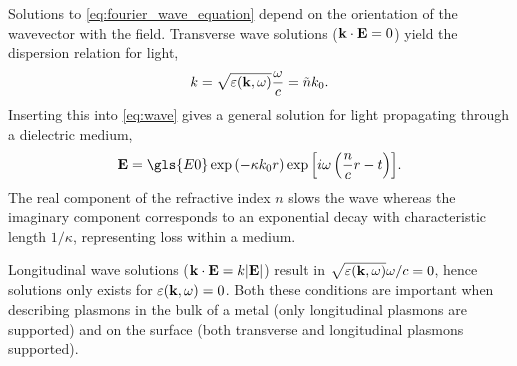\documentclass{article}
\begin{document}
Solutions to \eqref{eq:fourier_wave_equation} depend on the orientation of the wavevector with the field. Transverse wave solutions ($\mathbf{k}\cdot\mathbf{E}=0$) yield the dispersion relation for light,
\begin{equation}
	k = \sqrt{\varepsilon(\mathbf{k}, \omega)}\frac{\omega}{c}=\tilde{n}k_0.
	\label{eq:light_dispersion}
\end{equation}
Inserting this into \eqref{eq:wave} gives a general solution for light propagating through a dielectric medium,
\begin{equation}
	\vec{E} = \gls{E0} \exp{\left({-\kappa\wvz r}\right)} \exp{\left[{i\omega\left(\frac{n}{c}r - t\right)}\right]}.
	\label{eq:gen_wave_solution}
\end{equation}
The real component of the refractive index $n$ slows the wave whereas the imaginary component corresponds to an exponential decay with characteristic length $1/\kappa$, representing loss within a medium.

Longitudinal wave solutions ($\mathbf{k}\cdot\mathbf{E} = k|\mathbf{E}|$) result in $\sqrt{\varepsilon(\mathbf{k},\omega)}\omega/c = 0$, hence solutions only exists for $\varepsilon(\mathbf{k}, \omega)=0$. Both these conditions are important when describing plasmons in the bulk of a metal (only longitudinal plasmons are supported) and on the surface (both transverse and longitudinal plasmons supported).
\end{document}
